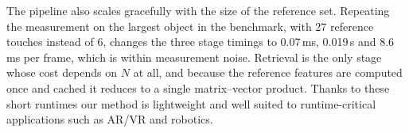 The pipeline also scales gracefully with the size of the reference set. Repeating the measurement
on the largest object in the benchmark, with 27 reference touches instead of 6, changes the three
stage timings to 0.07\,ms, 0.019\,s and 8.6\,ms per frame, which is within measurement noise.
Retrieval is the only stage whose cost depends on $N$ at all, and because the reference features
are computed once and cached it reduces to a single matrix--vector product. Thanks to these short
runtimes our method is lightweight and well suited to runtime-critical applications such as AR/VR
and robotics.
